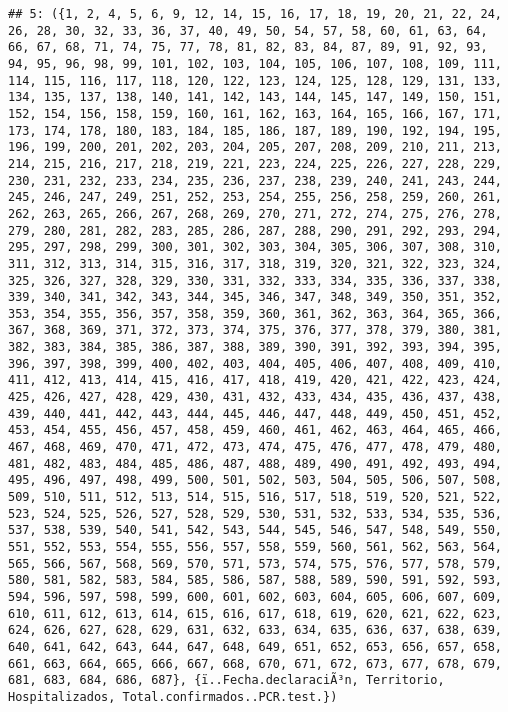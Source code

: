 \documentclass[
]{book}
\begin{document}
\begin{verbatim}
## 5: ({1, 2, 4, 5, 6, 9, 12, 14, 15, 16, 17, 18, 19, 20, 21, 22, 24, 26, 28, 30, 32, 33, 36, 37, 40, 49, 50, 54, 57, 58, 60, 61, 63, 64, 66, 67, 68, 71, 74, 75, 77, 78, 81, 82, 83, 84, 87, 89, 91, 92, 93, 94, 95, 96, 98, 99, 101, 102, 103, 104, 105, 106, 107, 108, 109, 111, 114, 115, 116, 117, 118, 120, 122, 123, 124, 125, 128, 129, 131, 133, 134, 135, 137, 138, 140, 141, 142, 143, 144, 145, 147, 149, 150, 151, 152, 154, 156, 158, 159, 160, 161, 162, 163, 164, 165, 166, 167, 171, 173, 174, 178, 180, 183, 184, 185, 186, 187, 189, 190, 192, 194, 195, 196, 199, 200, 201, 202, 203, 204, 205, 207, 208, 209, 210, 211, 213, 214, 215, 216, 217, 218, 219, 221, 223, 224, 225, 226, 227, 228, 229, 230, 231, 232, 233, 234, 235, 236, 237, 238, 239, 240, 241, 243, 244, 245, 246, 247, 249, 251, 252, 253, 254, 255, 256, 258, 259, 260, 261, 262, 263, 265, 266, 267, 268, 269, 270, 271, 272, 274, 275, 276, 278, 279, 280, 281, 282, 283, 285, 286, 287, 288, 290, 291, 292, 293, 294, 295, 297, 298, 299, 300, 301, 302, 303, 304, 305, 306, 307, 308, 310, 311, 312, 313, 314, 315, 316, 317, 318, 319, 320, 321, 322, 323, 324, 325, 326, 327, 328, 329, 330, 331, 332, 333, 334, 335, 336, 337, 338, 339, 340, 341, 342, 343, 344, 345, 346, 347, 348, 349, 350, 351, 352, 353, 354, 355, 356, 357, 358, 359, 360, 361, 362, 363, 364, 365, 366, 367, 368, 369, 371, 372, 373, 374, 375, 376, 377, 378, 379, 380, 381, 382, 383, 384, 385, 386, 387, 388, 389, 390, 391, 392, 393, 394, 395, 396, 397, 398, 399, 400, 402, 403, 404, 405, 406, 407, 408, 409, 410, 411, 412, 413, 414, 415, 416, 417, 418, 419, 420, 421, 422, 423, 424, 425, 426, 427, 428, 429, 430, 431, 432, 433, 434, 435, 436, 437, 438, 439, 440, 441, 442, 443, 444, 445, 446, 447, 448, 449, 450, 451, 452, 453, 454, 455, 456, 457, 458, 459, 460, 461, 462, 463, 464, 465, 466, 467, 468, 469, 470, 471, 472, 473, 474, 475, 476, 477, 478, 479, 480, 481, 482, 483, 484, 485, 486, 487, 488, 489, 490, 491, 492, 493, 494, 495, 496, 497, 498, 499, 500, 501, 502, 503, 504, 505, 506, 507, 508, 509, 510, 511, 512, 513, 514, 515, 516, 517, 518, 519, 520, 521, 522, 523, 524, 525, 526, 527, 528, 529, 530, 531, 532, 533, 534, 535, 536, 537, 538, 539, 540, 541, 542, 543, 544, 545, 546, 547, 548, 549, 550, 551, 552, 553, 554, 555, 556, 557, 558, 559, 560, 561, 562, 563, 564, 565, 566, 567, 568, 569, 570, 571, 573, 574, 575, 576, 577, 578, 579, 580, 581, 582, 583, 584, 585, 586, 587, 588, 589, 590, 591, 592, 593, 594, 596, 597, 598, 599, 600, 601, 602, 603, 604, 605, 606, 607, 609, 610, 611, 612, 613, 614, 615, 616, 617, 618, 619, 620, 621, 622, 623, 624, 626, 627, 628, 629, 631, 632, 633, 634, 635, 636, 637, 638, 639, 640, 641, 642, 643, 644, 647, 648, 649, 651, 652, 653, 656, 657, 658, 661, 663, 664, 665, 666, 667, 668, 670, 671, 672, 673, 677, 678, 679, 681, 683, 684, 686, 687}, {ï..Fecha.declaraciÃ³n, Territorio, Hospitalizados, Total.confirmados..PCR.test.})

\end{verbatim}
\end{document}
